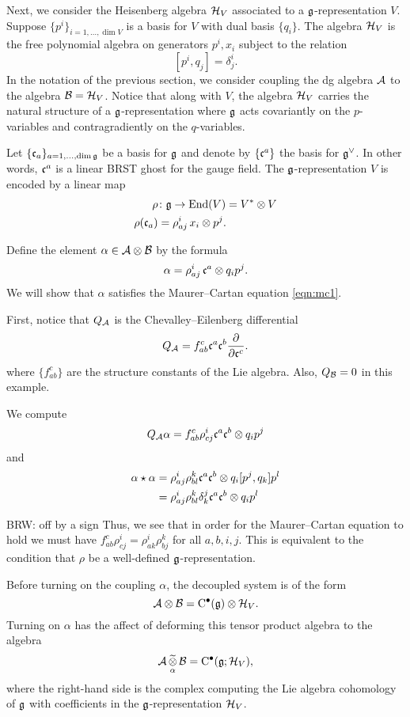 \documentclass[11pt]{amsart}
\def\brian#1{{\textcolor{blue!65!red}{BRW: {#1}}}}
\begin{document}
Next, we consider the Heisenberg algebra $\mathcal H_V$ associated to a $\mathfrak g$-representation $V$. 
Suppose $\{p^i\}_{i=1,\ldots,\dim V}$ is a basis for $V$ with dual basis $\{q_i\}$. 
The algebra $\mathcal H_V$ is the free polynomial algebra on generators $p^i, x_i$ subject to the relation 
\[
[p^i, q_j] = \delta_j^i .
\]
In the notation of the previous section, we consider coupling the dg algebra $\mathcal A$ to the algebra $\mathcal B = \mathcal H_V$. 
Notice that along with $V$, the algebra $\mathcal H_V$ carries the natural structure of a $\mathfrak g$-representation where $\mathfrak g$ acts covariantly on the $p$-variables and contragradiently on the $q$-variables. 

Let $\{\mathfrak c_a\}_{a=1,\dots,\dim \mathfrak g}$ be a basis for $\mathfrak g$ and denote by $\{\mathfrak c^a\}$ the basis for $\mathfrak g^\vee$. 
In other words, $\mathfrak c^a$ is a linear BRST ghost for the gauge field. 
The $\mathfrak g$-representation $V$ is encoded by a linear map 
\begin{align*}
\rho & \colon \mathfrak g \to {\rm End}(V) = V^* \otimes V \\
\rho(\mathfrak c_a) & = \rho_{aj}^i \, x_i \otimes p^j .
\end{align*}

Define the element $\alpha \in \mathcal A \otimes \mathcal B$ by the formula
\[
\alpha = \rho_{aj}^i \, \mathfrak c^a \otimes q_i p^j .
\]
We will show that $\alpha$ satisfies the Maurer--Cartan equation \eqref{eqn:mc1}. 

First, notice that $Q_{\mathcal A}$ is the Chevalley--Eilenberg differential 
\[
Q_{\mathcal A} = f_{ab}^c \mathfrak c^a \mathfrak c^b \frac{\partial}{\partial \mathfrak c^c} .
\]
where $\{f_{ab}^c\}$ are the structure constants of the Lie algebra. 
Also, $Q_{\mathcal B} = 0$ in this example. 

We compute
\[
Q_{\mathcal A} \alpha = f_{ab}^c \rho_{cj}^i \mathfrak c^a \mathfrak c^b \otimes q_i p^j 
\]
and
\begin{align*}
\alpha \star \alpha & = \rho_{aj}^i \rho_{bl}^k \mathfrak c^a \mathfrak c^b \otimes q_i [p^j, q_k] p^l \\
& = \rho_{aj}^i \rho_{bl}^k \delta^j_k \mathfrak c^a \mathfrak c^b \otimes q_i p^l 
\end{align*}

\brian{off by a sign}
Thus, we see that in order for the Maurer--Cartan equation to hold we must have $f_{ab}^c \rho_{cj}^i = \rho^i_{ak} \rho^k_{bj}$ for all $a,b,i,j$. 
This is equivalent to the condition that $\rho$ be a well-defined $\mathfrak g$-representation. 

Before turning on the coupling $\alpha$, the decoupled system is of the form
\[
\mathcal A \otimes \mathcal B = {\rm C}^\bullet(\mathfrak g) \otimes \mathcal H_V . 
\]
Turning on $\alpha$ has the affect of deforming this tensor product algebra to the algebra
\[
\mathcal A \, \underset{\alpha}{\widetilde{\otimes}} \, \mathcal B = {\rm C}^\bullet(\mathfrak g ; \mathcal H_V) ,
\]
where the right-hand side is the complex computing the Lie algebra cohomology of $\mathfrak g$ with coefficients in the $\mathfrak g$-representation $\mathcal H_V$. 
\end{document}
